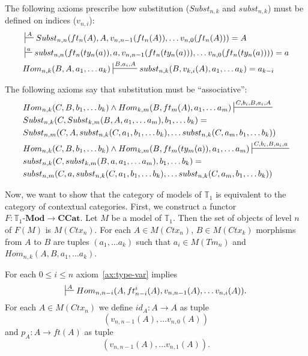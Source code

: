 \documentclass{amsart}
\theoremstyle{definition}
\theoremstyle{remark}
\newcommand{\cat}[1]{\mathbf{#1}}
\newcommand{\ccat}{\cat{CCat}}
\newcommand{\Mod}{\text{-}\cat{Mod}}
\numberwithin{figure}{section}
\begin{document}
The following axioms prescribe how substitution ($Subst_{n,k}$ and $subst_{n,k}$) must be defined on indices ($v_{n,i}$):
\begin{align}
\label{ax:Subst-var}
& \sststile{}{A}         Subst_{n,n}(ft_n(A), A, v_{n,n-1}(ft_n(A)), \ldots v_{n,0}(ft_n(A))) = A \\
\label{ax:subst-var}
& \sststile{}{a}         subst_{n,n}(ft_n(ty_n(a)), a, v_{n,n-1}(ft_n(ty_n(a))), \ldots v_{n,0}(ft_n(ty_n(a)))) = a \\
\label{ax:var-subst}
& Hom_{n,k}(B, A, a_1, \ldots a_k) \sststile{}{B, a_i, A} subst_{n,k}(B, v_{k,i}(A), a_1, \ldots a_k) = a_{k-i}
\end{align}

The following axioms say that substitution must be ``associative'':
\begin{align}
\label{ax:Subst-Subst}
& Hom_{n,k}(C, B, b_1, \ldots b_k) \land Hom_{k,m}(B, ft_m(A), a_1, \ldots a_m) \sststile{}{C, b_i, B, a_i, A} \\ \notag
& Subst_{n,k}(C, Subst_{k,m}(B, A, a_1, \ldots a_m), b_1, \ldots b_k) = \\ \notag
& Subst_{n,m}(C, A, subst_{n,k}(C, a_1, b_1, \ldots b_k), \ldots subst_{n,k}(C, a_m, b_1, \ldots b_k)) \\
\label{ax:subst-subst}
& Hom_{n,k}(C, B, b_1, \ldots b_k) \land Hom_{k,m}(B, ft_m(ty_m(a)), a_1, \ldots a_m) \sststile{}{C, b_i, B, a_i, a} \\ \notag
& subst_{n,k}(C, subst_{k,m}(B, a, a_1, \ldots a_m), b_1, \ldots b_k) = \\ \notag
& subst_{n,m}(C, a, subst_{n,k}(C, a_1, b_1, \ldots b_k), \ldots subst_{n,k}(C, a_m, b_1, \ldots b_k))
\end{align}

Now, we want to show that the category of models of $\mathbb{T}_1$ is equivalent to the category of contextual categories.
First, we construct a functor $F : \mathbb{T}_1\Mod \to \ccat$.
Let $M$ be a model of $\mathbb{T}_1$.
Then the set of objects of level $n$ of $F(M)$ is $M(Ctx_n)$.
For each $A \in M(Ctx_n)$, $B \in M(Ctx_k)$ morphisms from $A$ to $B$ are tuples $(a_1, \ldots a_k)$ such that $a_i \in M(Tm_n)$ and $Hom_{n,k}(A, B, a_1, \ldots a_k)$.

For each $0 \leq i \leq n$ axiom~\eqref{ax:type-var} implies
\[ \sststile{}{A} Hom_{n,n-i}(A, ft^i_{n-i}(A), v_{n,n-1}(A), \ldots v_{n,i}(A)). \]
For each $A \in M(Ctx_n)$ we define $id_A : A \to A$ as tuple
\[ (v_{n,n-1}(A), \ldots v_{n,0}(A)) \]
and $p_A : A \to ft(A)$ as tuple
\[ (v_{n,n-1}(A), \ldots v_{n,1}(A)). \]
\end{document}

